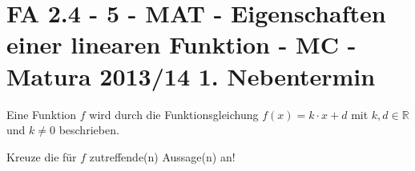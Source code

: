 \section{FA 2.4 - 5 - MAT - Eigenschaften einer linearen Funktion - MC - Matura 2013/14 1. Nebentermin}

\begin{beispiel}[FA 2.4]{1} %
				Eine Funktion $f$ wird durch die Funktionsgleichung $f(x)=k\cdot x+d$ mit $k,d\in\mathbb{R}$ und $k\neq 0$ beschrieben.
				
				Kreuze die für $f$ zutreffende(n) Aussage(n) an!\leer
				
\end{beispiel}